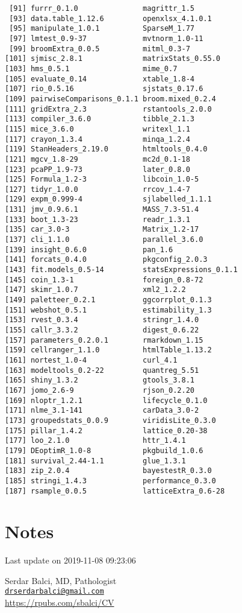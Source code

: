 \documentclass[]{article}
\begin{document}
\begin{verbatim}
 [91] furrr_0.1.0               magrittr_1.5             
 [93] data.table_1.12.6         openxlsx_4.1.0.1         
 [95] manipulate_1.0.1          SparseM_1.77             
 [97] lmtest_0.9-37             mvtnorm_1.0-11           
 [99] broomExtra_0.0.5          mitml_0.3-7              
[101] sjmisc_2.8.1              matrixStats_0.55.0       
[103] hms_0.5.1                 mime_0.7                 
[105] evaluate_0.14             xtable_1.8-4             
[107] rio_0.5.16                sjstats_0.17.6           
[109] pairwiseComparisons_0.1.1 broom.mixed_0.2.4        
[111] gridExtra_2.3             rstantools_2.0.0         
[113] compiler_3.6.0            tibble_2.1.3             
[115] mice_3.6.0                writexl_1.1              
[117] crayon_1.3.4              minqa_1.2.4              
[119] StanHeaders_2.19.0        htmltools_0.4.0          
[121] mgcv_1.8-29               mc2d_0.1-18              
[123] pcaPP_1.9-73              later_0.8.0              
[125] Formula_1.2-3             libcoin_1.0-5            
[127] tidyr_1.0.0               rrcov_1.4-7              
[129] expm_0.999-4              sjlabelled_1.1.1         
[131] jmv_0.9.6.1               MASS_7.3-51.4            
[133] boot_1.3-23               readr_1.3.1              
[135] car_3.0-3                 Matrix_1.2-17            
[137] cli_1.1.0                 parallel_3.6.0           
[139] insight_0.6.0             pan_1.6                  
[141] forcats_0.4.0             pkgconfig_2.0.3          
[143] fit.models_0.5-14         statsExpressions_0.1.1   
[145] coin_1.3-1                foreign_0.8-72           
[147] skimr_1.0.7               xml2_1.2.2               
[149] paletteer_0.2.1           ggcorrplot_0.1.3         
[151] webshot_0.5.1             estimability_1.3         
[153] rvest_0.3.4               stringr_1.4.0            
[155] callr_3.3.2               digest_0.6.22            
[157] parameters_0.2.0.1        rmarkdown_1.15           
[159] cellranger_1.1.0          htmlTable_1.13.2         
[161] nortest_1.0-4             curl_4.1                 
[163] modeltools_0.2-22         quantreg_5.51            
[165] shiny_1.3.2               gtools_3.8.1             
[167] jomo_2.6-9                rjson_0.2.20             
[169] nloptr_1.2.1              lifecycle_0.1.0          
[171] nlme_3.1-141              carData_3.0-2            
[173] groupedstats_0.0.9        viridisLite_0.3.0        
[175] pillar_1.4.2              lattice_0.20-38          
[177] loo_2.1.0                 httr_1.4.1               
[179] DEoptimR_1.0-8            pkgbuild_1.0.6           
[181] survival_2.44-1.1         glue_1.3.1               
[183] zip_2.0.4                 bayestestR_0.3.0         
[185] stringi_1.4.3             performance_0.3.0        
[187] rsample_0.0.5             latticeExtra_0.6-28      
\end{verbatim}

\pagebreak

\hypertarget{notes}{%
\section{Notes}\label{notes}}

Last update on 2019-11-08 09:23:06

Serdar Balci, MD, Pathologist\\
\href{mailto:drserdarbalci@gmail.com}{\nolinkurl{drserdarbalci@gmail.com}}\\
\url{https://rpubs.com/sbalci/CV}

\pagebreak

\newpage
\end{document}
